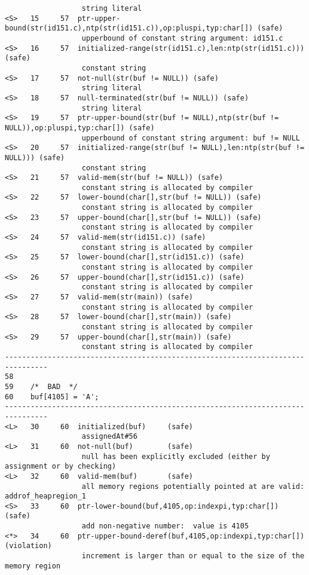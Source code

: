 \documentclass[11pt]{article}
\begin{document}
\begin{scriptsize}
\begin{verbatim}
                  string literal
<S>   15     57  ptr-upper-bound(str(id151.c),ntp(str(id151.c)),op:pluspi,typ:char[]) (safe)
                  upperbound of constant string argument: id151.c
<S>   16     57  initialized-range(str(id151.c),len:ntp(str(id151.c))) (safe)
                  constant string
<S>   17     57  not-null(str(buf != NULL)) (safe)
                  string literal
<S>   18     57  null-terminated(str(buf != NULL)) (safe)
                  string literal
<S>   19     57  ptr-upper-bound(str(buf != NULL),ntp(str(buf != NULL)),op:pluspi,typ:char[]) (safe)
                  upperbound of constant string argument: buf != NULL
<S>   20     57  initialized-range(str(buf != NULL),len:ntp(str(buf != NULL))) (safe)
                  constant string
<S>   21     57  valid-mem(str(buf != NULL)) (safe)
                  constant string is allocated by compiler
<S>   22     57  lower-bound(char[],str(buf != NULL)) (safe)
                  constant string is allocated by compiler
<S>   23     57  upper-bound(char[],str(buf != NULL)) (safe)
                  constant string is allocated by compiler
<S>   24     57  valid-mem(str(id151.c)) (safe)
                  constant string is allocated by compiler
<S>   25     57  lower-bound(char[],str(id151.c)) (safe)
                  constant string is allocated by compiler
<S>   26     57  upper-bound(char[],str(id151.c)) (safe)
                  constant string is allocated by compiler
<S>   27     57  valid-mem(str(main)) (safe)
                  constant string is allocated by compiler
<S>   28     57  lower-bound(char[],str(main)) (safe)
                  constant string is allocated by compiler
<S>   29     57  upper-bound(char[],str(main)) (safe)
                  constant string is allocated by compiler
--------------------------------------------------------------------------------
58
59    /*  BAD  */
60    buf[4105] = 'A';
--------------------------------------------------------------------------------
<L>   30     60  initialized(buf)     (safe)
                  assignedAt#56
<L>   31     60  not-null(buf)        (safe)
                  null has been explicitly excluded (either by assignment or by checking)
<L>   32     60  valid-mem(buf)       (safe)
                  all memory regions potentially pointed at are valid: addrof_heapregion_1
<S>   33     60  ptr-lower-bound(buf,4105,op:indexpi,typ:char[]) (safe)
                  add non-negative number:  value is 4105
<*>   34     60  ptr-upper-bound-deref(buf,4105,op:indexpi,typ:char[]) (violation)
                  increment is larger than or equal to the size of the memory region 

\end{verbatim}
\end{scriptsize}
\end{document}
